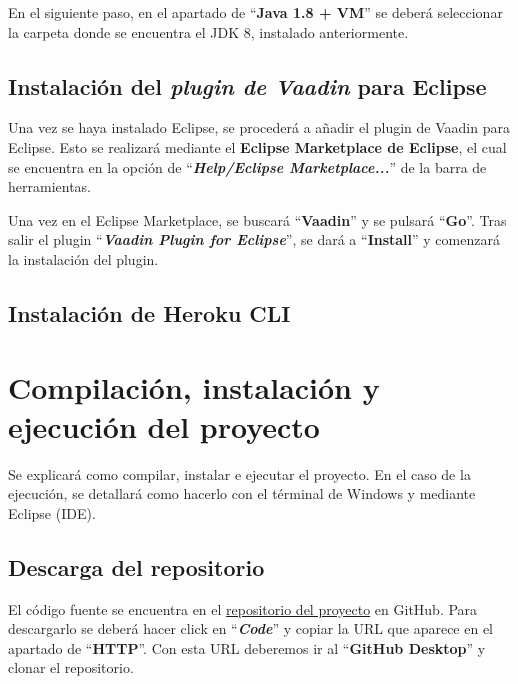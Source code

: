 En el siguiente paso, en el apartado de ``\textbf{Java 1.8 + VM}'' se deberá seleccionar la carpeta donde se encuentra el JDK 8, instalado anteriormente.


\subsection{Instalación del \textit{plugin de Vaadin} para Eclipse}
Una vez se haya instalado Eclipse, se procederá a añadir el plugin de Vaadin para Eclipse. Esto se realizará mediante el \textbf{Eclipse Marketplace de Eclipse}, el cual se encuentra en la opción de ``\textbf{\textit{Help/Eclipse Marketplace...}}'' de la barra de herramientas.


Una vez en el Eclipse Marketplace, se buscará ``\textbf{Vaadin}'' y se pulsará ``\textbf{Go}''. Tras salir el plugin ``\textbf{\textit{Vaadin Plugin for Eclipse}}'', se dará a ``\textbf{Install}'' y comenzará la instalación del plugin.


\subsection{Instalación de Heroku CLI}

\section{Compilación, instalación y ejecución del proyecto}
Se explicará como compilar, instalar e ejecutar el proyecto. En el caso de la ejecución, se detallará como hacerlo con el términal de Windows y mediante Eclipse (IDE).

\subsection{Descarga del repositorio}
El código fuente se encuentra en el \href{https://github.com/dbo1001/Gestor-TFG-2021}{repositorio del proyecto} en GitHub. Para descargarlo se deberá hacer click en ``\textbf{\textit{Code}}'' y copiar la URL que aparece en el apartado de ``\textbf{HTTP}''. Con esta URL deberemos ir al ``\textbf{GitHub Desktop}'' y clonar el repositorio.

